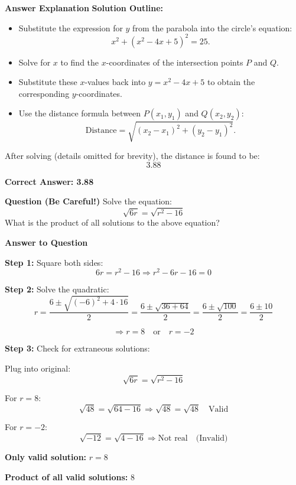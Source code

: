 \documentclass{beamer}
\begin{document}
\begin{frame}{\textbf{Answer Explanation}}
\textbf{Solution Outline:}
\begin{itemize}
    \item Substitute the expression for \(y\) from the parabola into the circle’s equation:
    \[
    x^2 + (x^2 - 4x + 5)^2 = 25.
    \]
    \item Solve for \(x\) to find the \(x\)-coordinates of the intersection points \(P\) and \(Q\).
    \item Substitute these \(x\)-values back into \(y = x^2 - 4x + 5\) to obtain the corresponding \(y\)-coordinates.
    \item Use the distance formula between \(P(x_1, y_1)\) and \(Q(x_2, y_2)\):
    \[
    \text{Distance} = \sqrt{(x_2 - x_1)^2 + (y_2 - y_1)^2}.
    \]
\end{itemize}

After solving (details omitted for brevity), the distance is found to be:
\[
3.88
\]

\bigskip
\textbf{Correct Answer: 3.88}
\end{frame}

\newpage
\begin{frame}{\textbf{Question  (Be Careful!)}}
Solve the equation:
\[
\sqrt{6r} = \sqrt{r^2 - 16}
\]
What is the product of all solutions to the above equation?
\end{frame}


\begin{frame}{\textbf{Answer to Question }}

\small
\textbf{Step 1:} Square both sides:
\[
6r = r^2 - 16
\Rightarrow r^2 - 6r - 16 = 0
\]

\textbf{Step 2:} Solve the quadratic:
\[
r = \frac{6 \pm \sqrt{(-6)^2 + 4 \cdot 16}}{2}
= \frac{6 \pm \sqrt{36 + 64}}{2}
= \frac{6 \pm \sqrt{100}}{2}
= \frac{6 \pm 10}{2}
\]

\[
\Rightarrow r = 8 \quad \text{or} \quad r = -2
\]

\textbf{Step 3:} Check for extraneous solutions:

Plug into original:
\[
\sqrt{6r} = \sqrt{r^2 - 16}
\]

For \(r = 8\): 
\[
\sqrt{48} = \sqrt{64 - 16} \Rightarrow \sqrt{48} = \sqrt{48} \quad \text{Valid}
\]

For \(r = -2\):
\[
\sqrt{-12} = \sqrt{4 - 16} \Rightarrow \text{Not real} \quad \text{(Invalid)}
\]

\textbf{Only valid solution: } \(r = 8\)

\bigskip
\textbf{Product of all valid solutions: } \( \boxed{8} \)
\end{frame}
\end{document}
